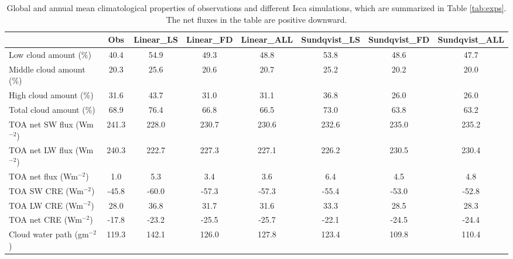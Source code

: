 \begin{sidewaystable}
	\caption{Global and annual mean climatological properties of observations and different Isca simulations, which are summarized in Table \ref{tab:exps}. The net fluxes in the table are positive downward. }
	\vspace{0.5em}
	\centering
	\renewcommand{\arraystretch}{1.5}
	\begin{threeparttable}
	\begin{tabular}{lccccccc}
    	\toprule
    	{} &   Obs &  Linear\_LS &  Linear\_FD &  Linear\_ALL &  Sundqvist\_LS &  Sundqvist\_FD &  Sundqvist\_ALL \\
    	\midrule
    	Low cloud amount (\%)    &  40.4\tnote{a} &       54.9 &       49.3 &        48.8 &          53.8 &          48.6 &           47.7 \\
        Middle cloud amount (\%) &  20.3\tnote{a} &       25.6 &       20.6 &        20.7 &          25.2 &          20.2 &           20.0 \\
        High cloud amount (\%)   &  31.6\tnote{a} &       43.7 &       31.0 &        31.1 &          36.8 &          26.0 &           26.0 \\
        Total cloud amount (\%)  &  68.9\tnote{a} &       76.4 &       66.8 &        66.5 &          73.0 &          63.8 &           63.2 \\
        TOA net SW flux  (Wm$^{-2}$)        & 241.3\tnote{b} &      228.0 &      230.7 &       230.6 &         232.6 &         235.0 &          235.2 \\
        TOA net LW flux  (Wm$^{-2}$)        & 240.3\tnote{b} &      222.7 &      227.3 &       227.1 &         226.2 &         230.5 &          230.4 \\
        TOA net flux  (Wm$^{-2}$)           &   1.0\tnote{b} &        5.3 &        3.4 &         3.6 &           6.4 &           4.5 &            4.8 \\
        TOA SW CRE (Wm$^{-2}$)              & -45.8\tnote{b} &      -60.0 &      -57.3 &       -57.3 &         -55.4 &         -53.0 &          -52.8 \\
        TOA LW CRE  (Wm$^{-2}$)             &  28.0\tnote{b} &       36.8 &       31.7 &        31.6 &          33.3 &          28.5 &           28.3 \\
        TOA net CRE  (Wm$^{-2}$)            & -17.8\tnote{b} &      -23.2 &      -25.5 &       -25.7 &         -22.1 &         -24.5 &          -24.4 \\
        Cloud water path  (gm$^{-2}$)       & 119.3\tnote{c}&      142.1 &      126.0 &       127.8 &         123.4 &         109.8 &          110.4 \\
    	\bottomrule
    \end{tabular}
    

\end{threeparttable}
\end{sidewaystable}
